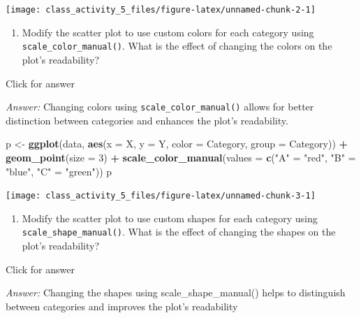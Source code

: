 \documentclass[
]{book}
\newenvironment{Shaded}{\begin{snugshade}}{\end{snugshade}}
\newcommand{\AttributeTok}[1]{\textcolor[rgb]{0.13,0.29,0.53}{#1}}
\newcommand{\DecValTok}[1]{\textcolor[rgb]{0.00,0.00,0.81}{#1}}
\newcommand{\FunctionTok}[1]{\textcolor[rgb]{0.13,0.29,0.53}{\textbf{#1}}}
\newcommand{\NormalTok}[1]{#1}
\newcommand{\OtherTok}[1]{\textcolor[rgb]{0.56,0.35,0.01}{#1}}
\newcommand{\SpecialCharTok}[1]{\textcolor[rgb]{0.81,0.36,0.00}{\textbf{#1}}}
\newcommand{\StringTok}[1]{\textcolor[rgb]{0.31,0.60,0.02}{#1}}
\providecommand{\tightlist}{%
  \setlength{\itemsep}{0pt}\setlength{\parskip}{0pt}}
\begin{document}
\texttt{[image: class\_activity\_5\_files/figure-latex/unnamed-chunk-2-1]}

\begin{enumerate}
\def\labelenumi{\alph{enumi}.}
\tightlist
\item
  Modify the scatter plot to use custom colors for each category using \texttt{scale\_color\_manual()}. What is the effect of changing the colors on the plot's readability?
\end{enumerate}

Click for answer

\emph{Answer:} Changing colors using \texttt{scale\_color\_manual()} allows for better distinction between categories and enhances the plot's readability.

\begin{Shaded}
\begin{Highlighting}[]
\NormalTok{p }\OtherTok{\textless{}{-}} \FunctionTok{ggplot}\NormalTok{(data, }\FunctionTok{aes}\NormalTok{(}\AttributeTok{x =}\NormalTok{ X, }\AttributeTok{y =}\NormalTok{ Y, }\AttributeTok{color =}\NormalTok{ Category, }\AttributeTok{group =}\NormalTok{ Category)) }\SpecialCharTok{+}
  \FunctionTok{geom\_point}\NormalTok{(}\AttributeTok{size =} \DecValTok{3}\NormalTok{) }\SpecialCharTok{+}
  \FunctionTok{scale\_color\_manual}\NormalTok{(}\AttributeTok{values =} \FunctionTok{c}\NormalTok{(}\StringTok{"A"} \OtherTok{=} \StringTok{"red"}\NormalTok{, }\StringTok{"B"} \OtherTok{=} \StringTok{"blue"}\NormalTok{, }\StringTok{"C"} \OtherTok{=} \StringTok{"green"}\NormalTok{))}
\NormalTok{p}
\end{Highlighting}
\end{Shaded}

\texttt{[image: class\_activity\_5\_files/figure-latex/unnamed-chunk-3-1]}

\begin{enumerate}
\def\labelenumi{\alph{enumi}.}
\setcounter{enumi}{1}
\tightlist
\item
  Modify the scatter plot to use custom shapes for each category using \texttt{scale\_shape\_manual()}. What is the effect of changing the shapes on the plot's readability?
\end{enumerate}

Click for answer

\emph{Answer:} Changing the shapes using scale\_shape\_manual() helps to distinguish between categories and improves the plot's readability
\end{document}
